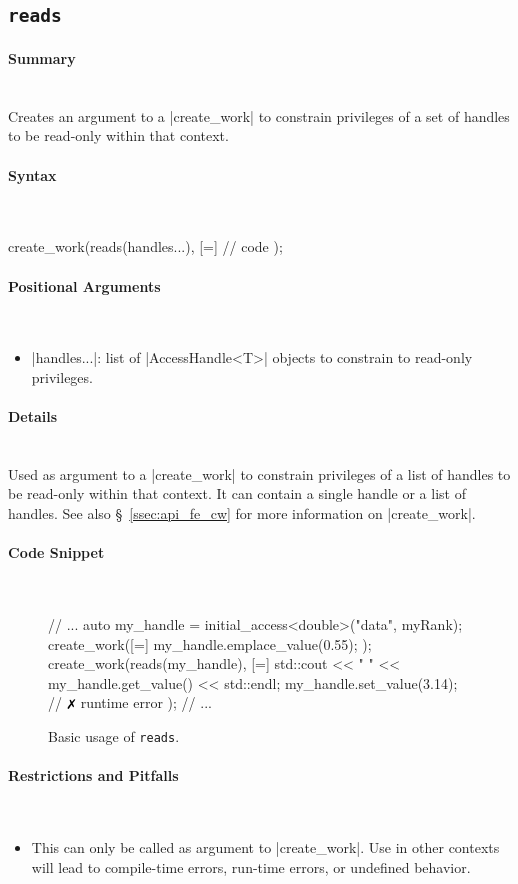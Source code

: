 \subsection{\texttt{reads}}
\label{ssec:api_fe_reads}

\paragraph{Summary} \mbox{}\\
Creates an argument to a |create_work| to constrain
privileges of a set of handles to be read-only within that context.

\paragraph{Syntax} \mbox{}\\
\begin{CppCode}
create_work(reads(handles...), [=]{
  // code 
});
\end{CppCode}

\paragraph{Positional Arguments} \mbox{}\\
\begin{itemize}
  \item |handles...|: list of |AccessHandle<T>| objects to
  constrain to read-only privileges.
\end{itemize}


\paragraph{Details} \mbox{}\\
Used as argument to a |create_work| to constrain
privileges of a list of handles to be read-only within that context.
It can contain a single handle or a list of handles.  See also
\S~\ref{ssec:api_fe_cw} for more information on |create_work|.


\paragraph{Code Snippet} \mbox{}\\
\begin{figure}[!h]
\begin{CppCodeNumb}
// ...
auto my_handle = initial_access<double>("data", myRank);
create_work([=]{
  my_handle.emplace_value(0.55);
});
create_work(reads(my_handle), [=]{
  std::cout << " " << my_handle.get_value() << std::endl;
  my_handle.set_value(3.14); // $\no$ runtime error
});
// ... 
\end{CppCodeNumb}
\label{fig:fe_api_reads}
\caption{Basic usage of \lstinline|reads|.}
\end{figure}


\paragraph{Restrictions and Pitfalls}\mbox{}\\
\begin{itemize}
  \item This can only be called as argument to |create_work|.  Use in
  other contexts will lead to compile-time errors, run-time errors, or
  undefined behavior.
\end{itemize}

